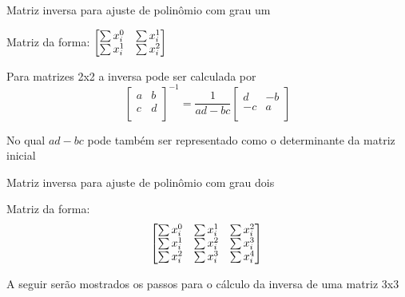\documentclass[10pt]{beamer}
\begin{document}
\begin{frame}[fragile]{Matriz inversa para ajuste de polinômio com grau um}
  
  Matriz da forma:                                   
  $\begin{bmatrix}
    \sum{x_{i}^{0}} & \sum{x_{i}^{1}} \\
    \sum{x_{i}^{1}} & \sum{x_{i}^{2}} \\
  \end{bmatrix} \newline $
  


  Para matrizes 2x2 a inversa pode ser calculada por
  \[
  \begin{bmatrix}
    {a} & {b} \\
    {c} & {d} \\
  \end{bmatrix}^{-1}
  = 
  \dfrac{1}{ad-bc}
  \begin{bmatrix}
    {d} & {-b} \\
    {-c} & {a} \\
  \end{bmatrix}
  \]

  No qual $ad-bc$ pode também ser representado como o determinante da matriz inicial

\end{frame}

\begin{frame}[fragile]{Matriz inversa para ajuste de polinômio com grau dois}
  
  Matriz da forma: 
  \[
  \begin{bmatrix}
    \sum{x_{i}^{0}} & \sum{x_{i}^{1}} & \sum{x_{i}^{2}} \\
    \sum{x_{i}^{1}} & \sum{x_{i}^{2}} & \sum{x_{i}^{3}} \\
    \sum{x_{i}^{2}} & \sum{x_{i}^{3}} & \sum{x_{i}^{4}}
  \end{bmatrix}
  \newline
  \newline
  \newline
  \newline\]



  

  A seguir serão mostrados os passos para o cálculo da inversa de uma matriz 3x3

\end{frame}
\end{document}
